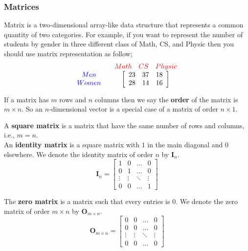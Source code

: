 \documentclass[12pt,aspectratio=169]{beamer}
\begin{document}
\begin{frame}
\frametitle{Matrices}
Matrix is a two-dimensional array-like data structure that represents a common quantity of two categories. For example, if you want to represent the number of students by gender in three different class of Math, CS, and Physic then you should use matrix representation as follow;
\[
\begin{array}{c c} &
\begin{array}{c c c} \textcolor{red}{Math} & \textcolor{red}{CS} & \textcolor{red}{Physic} \\
\end{array}
\\
\begin{array}{c c c}
\textcolor{blue}{Men} \\
\textcolor{blue}{Women}
\end{array}
&
\left[
\begin{array}{c c c}
23 & 37 & 18 \\
28 & 14 & 16 
\end{array}
\right]
\end{array}
\]
\end{frame}

\begin{frame}
If a matrix has $m$ rows and $n$ columns then we say the \textbf{order} of the matrix is $m\times n$. So an $n$-dimensional vector is a special case of a matrix of order $n\times 1$.  
\end{frame}



\begin{frame}
A \textbf{square matrix} is a matrix that have the same number of rows and columns, i.e., $m=n$.\\ \pause
An \textbf{identity matrix} is a square matrix with $1$ in the main diagonal and $0$ elsewhere. We denote the identity matrix of order $n$ by $\mathbf{I}_n$. \pause 
\[
\mathbf{I}_n=
\begin{bmatrix}
1 & 0 & \dots & 0\\
0 & 1 & \dots & 0\\
\vdots & \vdots & \ddots & \vdots\\
0 & 0 & \dots & 1
\end{bmatrix}
\]
\end{frame}


\begin{frame}
The \textbf{zero matrix} is a matrix such that every entries is $0$. We denote the zero matrix of order $m\times n$ by $\mathbf{O}_{m\times n}$. \pause 
\[
\mathbf{O}_{m\times n}=
\begin{bmatrix}
0 & 0 & \dots & 0\\
0 & 0 & \dots & 0\\
\vdots & \vdots & \ddots & \vdots\\
0 & 0 & \dots & 0
\end{bmatrix}
\]
\end{frame}
\end{document}
